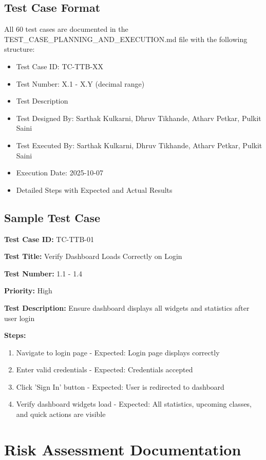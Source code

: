 \documentclass[12pt,a4paper]{report}
\begin{document}
\section{Test Case Format}
All 60 test cases are documented in the TEST\_CASE\_PLANNING\_AND\_EXECUTION.md file with the following structure:
\begin{itemize}[leftmargin=*]
    \item Test Case ID: TC-TTB-XX
    \item Test Number: X.1 - X.Y (decimal range)
    \item Test Description
    \item Test Designed By: Sarthak Kulkarni, Dhruv Tikhande, Atharv Petkar, Pulkit Saini
    \item Test Executed By: Sarthak Kulkarni, Dhruv Tikhande, Atharv Petkar, Pulkit Saini
    \item Execution Date: 2025-10-07
    \item Detailed Steps with Expected and Actual Results
\end{itemize}

\section{Sample Test Case}
\textbf{Test Case ID:} TC-TTB-01

\textbf{Test Title:} Verify Dashboard Loads Correctly on Login

\textbf{Test Number:} 1.1 - 1.4

\textbf{Priority:} High

\textbf{Test Description:} Ensure dashboard displays all widgets and statistics after user login

\textbf{Steps:}
\begin{enumerate}
    \item Navigate to login page - Expected: Login page displays correctly
    \item Enter valid credentials - Expected: Credentials accepted
    \item Click 'Sign In' button - Expected: User is redirected to dashboard
    \item Verify dashboard widgets load - Expected: All statistics, upcoming classes, and quick actions are visible
\end{enumerate}

\chapter{Risk Assessment Documentation}
\end{document}
